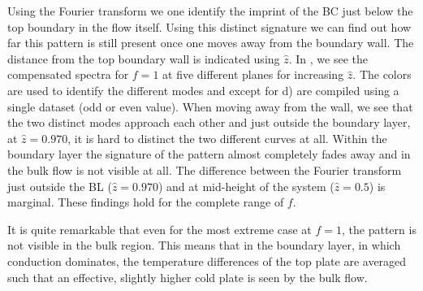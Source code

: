 Using the Fourier transform we one identify the imprint of the BC just below
the top boundary in the flow itself.  Using this distinct signature we can
find out how far this pattern is still present once one moves away from the
boundary wall.  The distance from the top boundary wall is indicated using
$\hat{z}$.  In , we see the compensated spectra for $f=1$
at five different planes for increasing $\hat{z}$.  The colors are used to
identify the different modes and except for d)
are compiled using a single dataset (odd or even value). 
When moving away from the wall, we see that the two distinct
modes approach each other and just outside the boundary layer, at
$\hat{z}=0.970$, it is hard to distinct the two different curves at all.
Within the boundary layer the signature of the pattern almost completely fades
away and in the bulk flow is not visible at all.  The difference between the
Fourier transform just outside the BL ($\hat{z}=0.970$) and at mid-height of
the system ($\hat{z}=0.5$) is marginal.  These findings hold for the complete
range of $f$.

It is quite remarkable that even for the most extreme case at $f=1$, the
pattern is not visible in the bulk region.  This means that in the boundary
layer, in which conduction dominates, the temperature differences of the top
plate are averaged such that an effective, slightly higher cold plate is seen
by the bulk flow.

